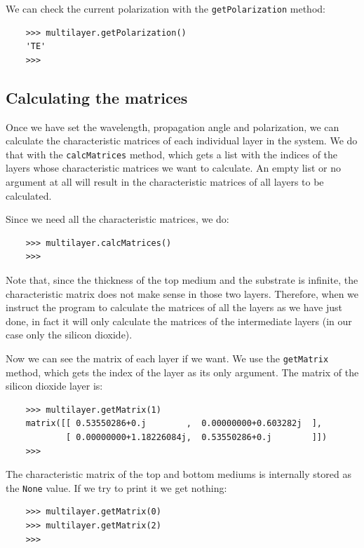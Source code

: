 \documentclass[a4paper,11pt,aps,final]{revtex4}
\begin{document}
We can check the current polarization with the \texttt{getPolarization} method:

\begin{verbatim}
    >>> multilayer.getPolarization()
    'TE'
    >>>
\end{verbatim}

\subsection{Calculating the matrices}

Once we have set the wavelength, propagation angle and polarization, we can calculate the characteristic matrices of each individual layer in the system. We do that with the \texttt{calcMatrices} method, which gets a list with the indices of the layers whose characteristic matrices we want to calculate. An empty list or no argument at all will result in the characteristic matrices of all layers to be calculated.

Since we need all the characteristic matrices, we do:

\begin{verbatim}
    >>> multilayer.calcMatrices()
    >>>
\end{verbatim}

Note that, since the thickness of the top medium and the substrate is infinite, the characteristic matrix does not make sense in those two layers. Therefore, when we instruct the program to calculate the matrices of all the layers as we have just done, in fact it will only calculate the matrices of the intermediate layers (in our case only the silicon dioxide).

Now we can see the matrix of each layer if we want. We use the \texttt{getMatrix} method, which gets the index of the layer as its only argument. The matrix of the silicon dioxide layer is:

\begin{verbatim}
    >>> multilayer.getMatrix(1)
    matrix([[ 0.53550286+0.j        ,  0.00000000+0.603282j  ],
            [ 0.00000000+1.18226084j,  0.53550286+0.j        ]])
    >>>
\end{verbatim}

The characteristic matrix of the top and bottom mediums is internally stored as the \texttt{None} value. If we try to print it we get nothing:

\begin{verbatim}
    >>> multilayer.getMatrix(0)
    >>> multilayer.getMatrix(2)
    >>>
\end{verbatim}
\end{document}
